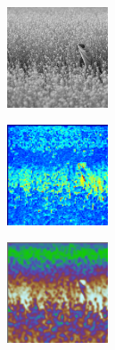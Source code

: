 \begin{figure}[t!] %
\begin{subfigure}{0.32\textwidth}
\includegraphics[height=3cm,width=3cm]{./Figures/girl/girl.jpg}
\caption{} 
\end{subfigure}\hspace*{\fill}
\begin{subfigure}{0.32\textwidth}
\includegraphics[height=3cm,width=3cm]{./Figures/girl/1.png}
\caption{} 
\end{subfigure}
\begin{subfigure}{0.32\textwidth}
\includegraphics[height=3cm,width=3cm]{./Figures/girl/2.png}
\caption{} 
\end{subfigure}


\end{figure}
